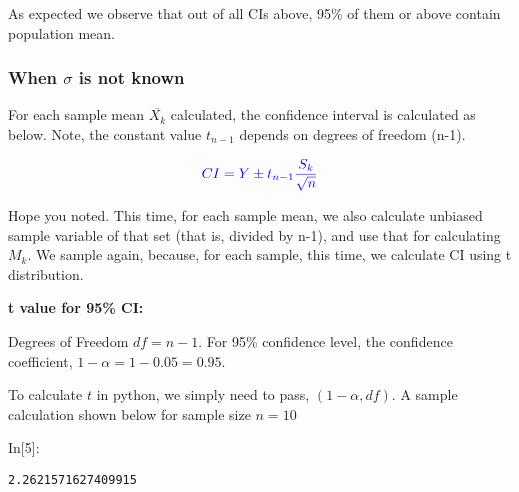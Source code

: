 \documentclass[float=false,crop=false]{standalone}
\begin{document}
    As expected we observe that out of all CIs above, 95\% of them or above
contain population mean.

    \subsubsection{\texorpdfstring{When \(\sigma\) is not
known}{When \textbackslash{}sigma is not known}}\label{when-sigma-is-not-known}

For each sample mean \(\overline{X_k}\) calculated, the confidence
interval is calculated as below. Note, the constant value \(t_{n-1}\)
depends on degrees of freedom (n-1).

\begin{equation}
\color{blue}{CI = Y \pm t_{n-1} \dfrac{S_k}{\sqrt{n}}}
\end{equation}

Hope you noted. This time, for each sample mean, we also calculate
unbiased sample variable of that set (that is, divided by n-1), and use
that for calculating \(M_k\). We sample again, because, for each sample,
this time, we calculate CI using t distribution.

\textbf{t value for 95\% CI:}

Degrees of Freedom \(df=n-1\). For 95\% confidence level, the confidence
coefficient, \(1 - \alpha = 1 - 0.05 = 0.95\).

To calculate \(t\) in python, we simply need to pass,
\((1-\alpha, df)\). A sample calculation shown below for sample size
\(n = 10\)
\begin{InVerbatim}[commandchars=\\\{\},fontsize=\scriptsize]
{\color{incolor}In[{\color{incolor}5}]:}    
         
\end{InVerbatim}
    \begin{Verbatim}[commandchars=\\\{\},fontsize=\footnotesize]
2.2621571627409915

    \end{Verbatim}
\end{document}
